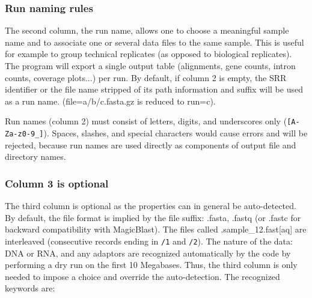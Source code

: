 \documentclass[11pt]{article}
\newcommand{\code}[1]{\texttt{#1}}
\begin{document}
\subsubsection{Run naming rules}

The second column, the run name, allows one to choose
a meaningful sample name and to associate one or several data files to
the same sample. This is useful for example to group technical replicates (as opposed
to biological replicates). The program will export a single output table
(alignments, gene counts, intron counts, coverage plots...) per run.
By default, if column 2 is empty, the SRR identifier
or the file name stripped of its path information and suffix will be used as a run name.
(file=a/b/c.fasta.gz  is reduced to run=c).

\begin{warnbox}
Run names (column 2) must consist of letters, digits, and underscores
only (\code{[A-Za-z0-9\_]}).  Spaces, slashes, and special characters
would cause errors and will be rejected, because run names are used directly as components of
output file and directory names.
\end{warnbox}


\subsubsection{Column 3 is optional}

The third column is optional as the properties can in general be auto-detected.
By default, the file format is implied by the file suffix: .fasta, .fastq (or
.fastc for backward compatibility with MagicBlast).
The files called .sample\_12.fast[aq] are interleaved
(consecutive records ending in \code{/1} and \code{/2}).
The nature of the data: DNA or RNA, and any adaptors are recognized automatically
by the code by performing a dry run on the first 10 Megabases.
Thus, the third column is only needed to impose a choice and override the auto-detection.
The recognized keywords are:
\end{document}

